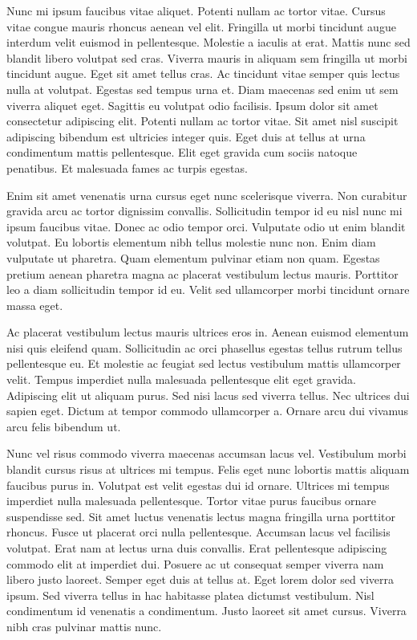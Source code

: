 Nunc mi ipsum faucibus vitae aliquet. Potenti nullam ac tortor vitae. Cursus vitae congue mauris rhoncus aenean vel elit. Fringilla ut morbi tincidunt augue interdum velit euismod in pellentesque. Molestie a iaculis at erat. Mattis nunc sed blandit libero volutpat sed cras. Viverra mauris in aliquam sem fringilla ut morbi tincidunt augue. Eget sit amet tellus cras. Ac tincidunt vitae semper quis lectus nulla at volutpat. Egestas sed tempus urna et. Diam maecenas sed enim ut sem viverra aliquet eget. Sagittis eu volutpat odio facilisis. Ipsum dolor sit amet consectetur adipiscing elit. Potenti nullam ac tortor vitae. Sit amet nisl suscipit adipiscing bibendum est ultricies integer quis. Eget duis at tellus at urna condimentum mattis pellentesque. Elit eget gravida cum sociis natoque penatibus. Et malesuada fames ac turpis egestas.

Enim sit amet venenatis urna cursus eget nunc scelerisque viverra. Non curabitur gravida arcu ac tortor dignissim convallis. Sollicitudin tempor id eu nisl nunc mi ipsum faucibus vitae. Donec ac odio tempor orci. Vulputate odio ut enim blandit volutpat. Eu lobortis elementum nibh tellus molestie nunc non. Enim diam vulputate ut pharetra. Quam elementum pulvinar etiam non quam. Egestas pretium aenean pharetra magna ac placerat vestibulum lectus mauris. Porttitor leo a diam sollicitudin tempor id eu. Velit sed ullamcorper morbi tincidunt ornare massa eget.

Ac placerat vestibulum lectus mauris ultrices eros in. Aenean euismod elementum nisi quis eleifend quam. Sollicitudin ac orci phasellus egestas tellus rutrum tellus pellentesque eu. Et molestie ac feugiat sed lectus vestibulum mattis ullamcorper velit. Tempus imperdiet nulla malesuada pellentesque elit eget gravida. Adipiscing elit ut aliquam purus. Sed nisi lacus sed viverra tellus. Nec ultrices dui sapien eget. Dictum at tempor commodo ullamcorper a. Ornare arcu dui vivamus arcu felis bibendum ut.

Nunc vel risus commodo viverra maecenas accumsan lacus vel. Vestibulum morbi blandit cursus risus at ultrices mi tempus. Felis eget nunc lobortis mattis aliquam faucibus purus in. Volutpat est velit egestas dui id ornare. Ultrices mi tempus imperdiet nulla malesuada pellentesque. Tortor vitae purus faucibus ornare suspendisse sed. Sit amet luctus venenatis lectus magna fringilla urna porttitor rhoncus. Fusce ut placerat orci nulla pellentesque. Accumsan lacus vel facilisis volutpat. Erat nam at lectus urna duis convallis. Erat pellentesque adipiscing commodo elit at imperdiet dui. Posuere ac ut consequat semper viverra nam libero justo laoreet. Semper eget duis at tellus at. Eget lorem dolor sed viverra ipsum. Sed viverra tellus in hac habitasse platea dictumst vestibulum. Nisl condimentum id venenatis a condimentum. Justo laoreet sit amet cursus. Viverra nibh cras pulvinar mattis nunc.

